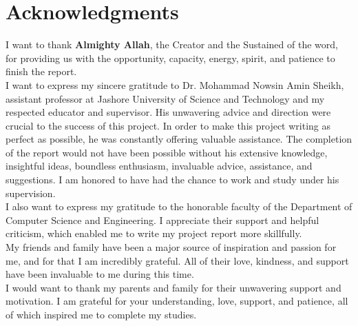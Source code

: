 \documentclass{thesis-library}
\begin{document}
\chapter*{Acknowledgments}
I want to thank \textbf{Almighty Allah}, the Creator and the Sustained of the word, for providing us with the opportunity, capacity, energy, spirit, and patience to finish the report.
\\
I want to express my sincere gratitude to Dr. Mohammad Nowsin Amin Sheikh, assistant professor at Jashore University of Science and Technology and my respected educator and supervisor. His unwavering advice and direction were crucial to the success of this project. In order to make this project writing as perfect as possible, he was constantly offering valuable assistance. The completion of the report would not have been possible without his extensive knowledge, insightful ideas, boundless enthusiasm, invaluable advice, assistance, and suggestions. I am honored to have had the chance to work and study under his supervision.
\\
I also want to express my gratitude to the honorable faculty of the Department of Computer Science and Engineering. I appreciate their support and helpful criticism, which enabled me to write my project report more skillfully.
\\
My friends and family have been a major source of inspiration and passion for me, and for that I am incredibly grateful. All of their love, kindness, and support have been invaluable to me during this time.
\\
I would want to thank my parents and family for their unwavering support and motivation. I am grateful for your understanding, love, support, and patience, all of which inspired me to complete my studies.

\listofabbreviations

\tableofcontents

\newpage
\listoffigures
\newpage
\listoftables
\newpage
\end{document}
